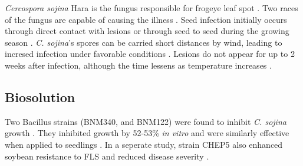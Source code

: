 \documentclass[letterpaper, 12pt]{report}
\begin{document}
\emph{Cercospora sojina} Hara is the fungus responsible for frogeye leaf spot \autocite{mian2008frogeye}. Two races of the fungus are capable of causing the illness \autocite{dunleavy1966soybean}. Seed infection initially occurs through direct contact with lesions or through seed to seed during the growing season \autocite{mian2008frogeye}. \emph{C. sojina}'s spores can be carried short distances by wind, leading to incresed infection under favorable conditions \autocite{mian2008frogeye}. Lesions do not appear for up to 2 weeks after infection, although the time lessens as temperature increases \autocite{mian2008frogeye}.

\subsection{Biosolution}

Two Bacillus strains (BNM340, and BNM122) were found to inhibit \emph{C. sojina} growth \autocite{simonetti2012evaluation}. They inhibited growth by 52-53\% \emph{in vitro} and were similarly effective when applied to seedlings \autocite{simonetti2012evaluation}. In a seperate study, strain CHEP5 also enhanced soybean resistance to FLS and reduced disease severity \autocite{tonelli2014biocontrol}.


\printbibliography[title=References]
\end{document}
